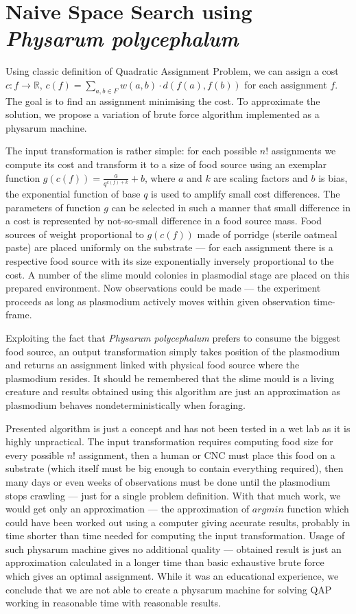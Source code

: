 \section{Naive Space Search using \textit{Physarum polycephalum}}
\label{section:algorithm_naive}

Using classic definition of Quadratic Assignment Problem, we can assign a cost $c : f \rightarrow \mathbb{R}$, $c(f) = \sum_{a,b\in F}w(a,b)\cdot d(f(a), f(b))$ for each assignment $f$. The goal is to find an assignment minimising the cost. To approximate the solution, we propose a variation of brute force algorithm implemented as a physarum machine.

The input transformation is rather simple: for each possible $n!$ assignments we compute its cost and transform it to a size of food source using an exemplar function $g(c(f)) = \frac{a}{q^{c(f)+k}}+b$, where $a$ and $k$ are scaling factors and $b$ is bias, the exponential function of base $q$ is used to amplify small cost differences. The parameters of function $g$ can be selected in such a manner that small difference in a cost is represented by not-so-small difference in a food source mass. Food sources of weight proportional to $g(c(f))$ made of porridge (sterile oatmeal paste) are placed uniformly on the substrate --- for each assignment there is a respective food source with its size exponentially inversely proportional to the cost. A number of the slime mould colonies in plasmodial stage are placed on this prepared environment. Now observations could be made --- the experiment proceeds as long as plasmodium actively moves within given observation time-frame. 

Exploiting the fact that \textit{Physarum polycephalum} prefers to consume the biggest food source, an output transformation simply takes position of the plasmodium and returns an assignment linked with physical food source where the plasmodium resides. It should be remembered that the slime mould is a living creature and results obtained using this algorithm are just an approximation as plasmodium behaves nondeterministically when foraging.

Presented algorithm is just a concept and has not been tested in a wet lab as it is highly unpractical. The input transformation requires computing food size for every possible $n!$ assignment, then a human or CNC must place this food on a substrate (which itself must be big enough to contain everything required), then many days or even weeks of observations must be done until the plasmodium stops crawling --- just for a single problem definition. With that much work, we would get only an approximation --- the approximation of $argmin$ function which could have been worked out using a computer giving accurate results, probably in time shorter than time needed for computing the input transformation. Usage of such physarum machine gives no additional quality --- obtained result is just an approximation calculated in a longer time than basic exhaustive brute force which gives an optimal assignment. While it was an educational experience, we conclude that we are not able to create a physarum machine for solving QAP working in reasonable time with reasonable results.
